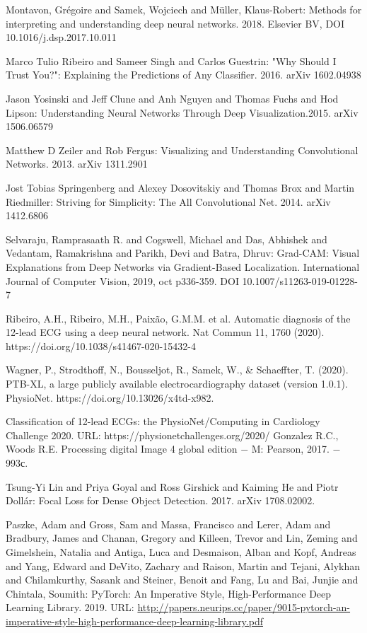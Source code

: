 \documentclass[oneside,final,14pt]{extreport}
\begin{document}
\begin{thebibliography}{0}


Montavon, Grégoire and Samek, Wojciech and Müller, Klaus-Robert: Methods for interpreting and understanding deep neural networks. 2018. Elsevier BV, DOI 10.1016/j.dsp.2017.10.011 

Marco Tulio Ribeiro and Sameer Singh and Carlos Guestrin: "Why Should I Trust You?": Explaining the Predictions of Any Classifier. 2016. arXiv 1602.04938

Jason Yosinski and Jeff Clune and Anh Nguyen and Thomas Fuchs and Hod Lipson: Understanding Neural Networks Through Deep Visualization.2015. arXiv 1506.06579

Matthew D Zeiler and Rob Fergus: Visualizing and Understanding Convolutional Networks. 2013. arXiv 1311.2901
 
 Jost Tobias Springenberg and Alexey Dosovitskiy and Thomas Brox and Martin Riedmiller: Striving for Simplicity: The All Convolutional Net. 2014. arXiv 1412.6806 
 
 Selvaraju, Ramprasaath R. and Cogswell, Michael and Das, Abhishek and Vedantam, Ramakrishna and Parikh, Devi and Batra, Dhruv: Grad-CAM: Visual Explanations from Deep Networks via Gradient-Based Localization. International Journal of Computer Vision, 2019, oct p336-359. DOI 10.1007/s11263-019-01228-7 
 
 Ribeiro, A.H., Ribeiro, M.H., Paixão, G.M.M. et al. Automatic diagnosis of the 12-lead ECG using a deep neural network. Nat Commun 11, 1760 (2020). https://doi.org/10.1038/s41467-020-15432-4
 
 Wagner, P., Strodthoff, N., Bousseljot, R., Samek, W., \& Schaeffter, T. (2020). PTB-XL, a large publicly available electrocardiography dataset (version 1.0.1). PhysioNet. https://doi.org/10.13026/x4td-x982.
 
 Classification of 12-lead ECGs: the PhysioNet/Computing in Cardiology Challenge 2020. URL: https://physionetchallenges.org/2020/
  Gonzalez R.C.,  Woods R.E. Processing digital Image 4 global edition $-$ M: Pearson, 2017. $-$ 993с. 

Tsung-Yi Lin and Priya Goyal and Ross Girshick and Kaiming He and Piotr Dollár: Focal Loss for Dense Object Detection. 2017. arXiv 1708.02002.

Paszke, Adam and Gross, Sam and Massa, Francisco and Lerer, Adam and Bradbury, James and Chanan, Gregory and Killeen, Trevor and Lin, Zeming and Gimelshein, Natalia and Antiga, Luca and Desmaison, Alban and Kopf, Andreas and Yang, Edward and DeVito, Zachary and Raison, Martin and Tejani, Alykhan and Chilamkurthy, Sasank and Steiner, Benoit and Fang, Lu and Bai, Junjie and Chintala, Soumith: PyTorch: An Imperative Style, High-Performance Deep Learning Library. 2019. URL: \url{http://papers.neurips.cc/paper/9015-pytorch-an-imperative-style-high-performance-deep-learning-library.pdf}
\end{thebibliography}
\end{document}

